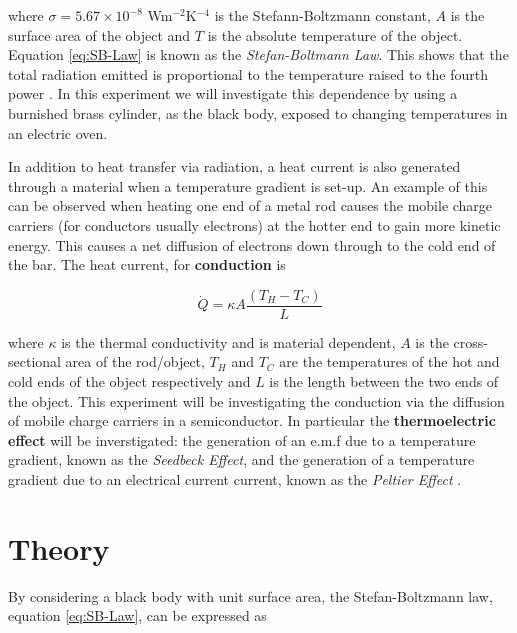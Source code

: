 \documentclass{article}
\begin{document}
\vspace{2mm}
\noindent
where $\sigma = 5.67 \times 10^{-8}$ Wm$^{-2}$K$^{-4}$ is the Stefann-Boltzmann constant, $A$ is the surface area of the object and $T$ is the absolute temperature of the object. Equation \eqref{eq:SB-Law} is known as the \textit{Stefan-Boltmann Law}. This shows that the total radiation emitted is proportional to the temperature raised to the fourth power \cite{Paper01}. %
In this experiment we will investigate this dependence by using a burnished brass cylinder, as the black body, exposed to changing temperatures in an electric oven.

\vspace{2mm}
\noindent
In addition to heat transfer via radiation, a heat current is also generated through a material when a temperature gradient is set-up. An example of this can be observed when heating one end of a metal rod causes the mobile charge carriers (for conductors usually electrons) \cite{Paper01} at the hotter end to gain more kinetic energy. This causes a net diffusion of electrons down through to the cold end of the bar. The heat current, for \textbf{conduction} is 

\begin{equation}
\label{eq:Conduction}
\dot{Q} = \kappa A \frac{(T_H - T_C)}{L}
\end{equation}

\vspace{2mm}
\noindent
where $\kappa$ is the thermal conductivity and is material dependent, $A$ is the cross-sectional area of the rod/object, $T_H$ and $T_C$ are the temperatures of the hot and cold ends of the object respectively and $L$ is the length between the two ends of the object. This experiment will be investigating the conduction via the diffusion of mobile charge carriers \cite{Paper02} in a semiconductor. In particular the \textbf{thermoelectric effect} will be inverstigated: the generation of an e.m.f due to a temperature gradient, known as the \textit{Seedbeck Effect}, and the generation of a temperature gradient due to an electrical current current, known as the \textit{Peltier Effect} \cite{Paper02}.


\section{Theory}
\label{sec:theory}

By considering a black body with unit surface area, the Stefan-Boltzmann law, equation \eqref{eq:SB-Law}, can be expressed as
\end{document}
